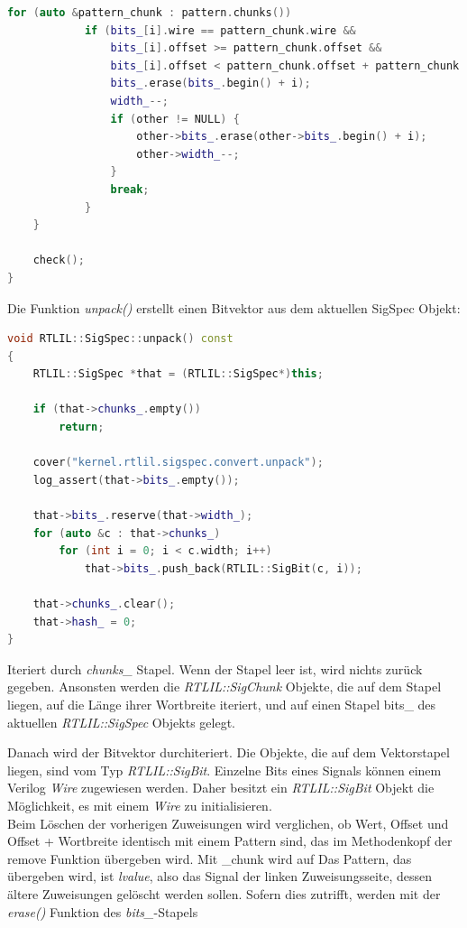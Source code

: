 \documentclass[11pt]{report}
\begin{document}
\begin{enumerate}
\begin{lstlisting}[language=C++]
		for (auto &pattern_chunk : pattern.chunks())
			if (bits_[i].wire == pattern_chunk.wire &&
				bits_[i].offset >= pattern_chunk.offset &&
				bits_[i].offset < pattern_chunk.offset + pattern_chunk.width) {
				bits_.erase(bits_.begin() + i);
				width_--;
				if (other != NULL) {
					other->bits_.erase(other->bits_.begin() + i);
					other->width_--;
				}
				break;
			}
	}

	check();
}
\end{lstlisting}
Die Funktion \textit{unpack()} erstellt einen Bitvektor aus dem aktuellen SigSpec Objekt:
\begin{lstlisting}[language=C++]
void RTLIL::SigSpec::unpack() const
{
	RTLIL::SigSpec *that = (RTLIL::SigSpec*)this;

	if (that->chunks_.empty())
		return;

	cover("kernel.rtlil.sigspec.convert.unpack");
	log_assert(that->bits_.empty());

	that->bits_.reserve(that->width_);
	for (auto &c : that->chunks_)
		for (int i = 0; i < c.width; i++)
			that->bits_.push_back(RTLIL::SigBit(c, i));

	that->chunks_.clear();
	that->hash_ = 0;
}
\end{lstlisting}
Iteriert durch \textit{chunks\_} Stapel. Wenn der Stapel leer ist, wird nichts zurück gegeben. Ansonsten werden die \textit{RTLIL::SigChunk} Objekte, die auf dem Stapel liegen, auf die Länge ihrer Wortbreite iteriert, und auf einen Stapel bits\_ des aktuellen \textit{RTLIL::SigSpec} Objekts gelegt.


Danach wird der Bitvektor durchiteriert. Die Objekte, die auf dem Vektorstapel liegen, sind vom Typ \textit{RTLIL::SigBit}. Einzelne Bits eines Signals können einem Verilog \textit{Wire} zugewiesen werden. Daher besitzt ein \textit{RTLIL::SigBit} Objekt die Möglichkeit, es mit einem \textit{Wire} zu initialisieren.\\
Beim Löschen der vorherigen Zuweisungen wird verglichen, ob Wert, Offset und Offset + Wortbreite identisch mit einem Pattern sind, das im Methodenkopf der remove Funktion übergeben wird.
Mit \_chunk wird auf 
Das Pattern, das übergeben wird, ist \textit{lvalue}, also das Signal der linken Zuweisungsseite, dessen ältere Zuweisungen gelöscht werden sollen.
Sofern dies zutrifft, werden mit der \textit{erase()} Funktion des \textit{bits\_}-Stapels


\end{enumerate}
\end{document}
